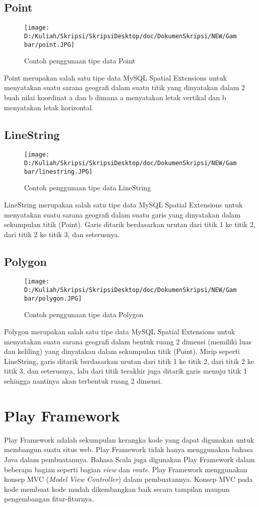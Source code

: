 \subsection{Point}
\label{point}
\begin{figure}[htbp]
	\centering
		\texttt{[image: D:/Kuliah/Skripsi/SkripsiDesktop/doc/DokumenSkripsi/NEW/Gambar/point.JPG]}
	\caption{Contoh penggunaan tipe data Point\cite{mysqltipedata}}
	\label{fig:point}
\end{figure}
Point merupakan salah satu tipe data MySQL Spatial Extensions untuk menyatakan suatu sarana geografi dalam suatu titik yang dinyatakan dalam 2 buah nilai koordinat a dan b dimana a menyatakan letak vertikal dan b menyatakan letak horizontal.

\subsection{LineString}
\label{linestring}
\begin{figure}[htbp]
	\centering
		\texttt{[image: D:/Kuliah/Skripsi/SkripsiDesktop/doc/DokumenSkripsi/NEW/Gambar/linestring.JPG]}
	\caption{Contoh penggunaan tipe data LineString\cite{mysqltipedata}}
	\label{fig:linestring}
\end{figure}
LineString merupakan salah satu tipe data MySQL Spatial Extensions untuk menyatakan suatu sarana geografi dalam suatu garis yang dinyatakan dalam sekumpulan titik (Point). Garis ditarik berdasarkan urutan dari titik 1 ke titik 2, dari titik 2 ke titik 3, dan seterusnya.

\subsection{Polygon}
\label{Polygon}
\begin{figure}[htbp]
	\centering
		\texttt{[image: D:/Kuliah/Skripsi/SkripsiDesktop/doc/DokumenSkripsi/NEW/Gambar/polygon.JPG]}
	\caption{Contoh penggunaan tipe data Polygon\cite{mysqltipedata}}
	\label{fig:polygon}
\end{figure}
Polygon merupakan salah satu tipe data MySQL Spatial Extensions untuk menyatakan suatu sarana geografi dalam bentuk ruang 2 dimensi (memiliki luas dan keliling) yang dinyatakan dalam sekumpulan titik (Point). Mirip seperti LineString, garis ditarik berdasarkan urutan dari titik 1 ke titik 2, dari titik 2 ke titik 3, dan seterusnya, lalu dari titik terakhir juga ditarik garis menuju titik 1 sehingga nantinya akan terbentuk ruang 2 dimensi.

	
\section{Play Framework}
\label{sec:play_framework}
Play Framework adalah sekumpulan kerangka kode yang dapat digunakan untuk membangun suatu situs web. Play Framework tidak hanya menggunakan bahasa Java dalam pembuatannya. Bahasa Scala juga digunakan Play Framework dalam beberapa bagian seperti bagian \textit{view} dan \textit{route}\cite{playforjava}. Play Framework menggunakan konsep MVC (\textit{Model} \textit{View} \textit{Controller}) dalam pembuatannya. Konsep MVC pada kode membuat kode mudah dikembangkan baik secara tampilan maupun pengembangan fitur-fiturnya.
